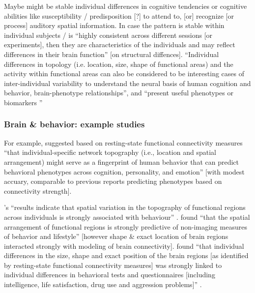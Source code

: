 %
Maybe might be stable individual differences in cognitive tendencies or
cognitive abilities like susceptibility / predisposition [?] to attend to, [or]
recognize [or process] auditory spatial information.
In case the pattern is stable within individual subjects / is ``highly
consistent across different sessions [or experiments], then they are
characteristics of the individuals and may reflect differences in their brain
function'' \citep{kanai2011structural} [on structural diffences].
%
``Individual differences in topology (i.e. location, size, shape of functional
areas) and the activity within functional areas can also be considered to be
interesting cases of inter-individual variability to understand the neural basis
of human cognition and behavior, brain-phenotype relationships'', and ``present
useful phenotypes or biomarkers \citep{glasser2016multi,
vanhorn2008individual}''


\subsubsection{Brain \& behavior: example studies}


%
For example, \citet{kong2019spatial} suggested based on resting-state functional
connectivity measures ``that individual-specific network topography (i.e.,
location and spatial arrangement) might serve as a fingerprint of human behavior
that can predict behavioral phenotypes across cognition, personality, and
emotion'' \citep{kong2019spatial} [with modest accuary, comparable to previous
reports predicting phenotypes based on connectivity strength].

%
\citep{bijsterbosch2018relationship}'s ``results indicate that spatial variation
in the topography of functional regions across individuals is strongly
associated with behaviour'' \citep{bijsterbosch2018relationship}.
%
\citet{bijsterbosch2018relationship} found ``that the spatial arrangement of
functional regions is strongly predictive of non-imaging measures of behavior
and lifestyle'' [however shape \& exact location of brain regions interacted
strongly with  modeling of brain connectivity].
%
\citet{bijsterbosch2018relationship} found ``that individual differences in the
size, shape and exact position of the brain regions [as identified by
resting-state functional connectivity measures] was strongly linked to
individual differences in behavioral tests and questionnaires [including
intelligence, life satisfaction, drug use and aggression problems]''
\citep{bijsterbosch2018relationship}.

